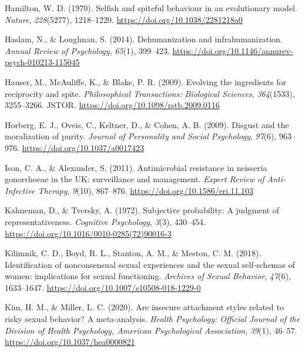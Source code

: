 \documentclass[
  english,
  donotrepeattitle,doc, 12pt, a4paper,floatsintext]{apa7}
\newlength{\cslhangindent}
\newlength{\cslentryspacingunit} %
\newenvironment{CSLReferences}[2] %
 {%
  \setlength{\parindent}{0pt}
  \ifodd #1
  \let\oldpar\par
  \def\par{\hangindent=\cslhangindent\oldpar}
  \fi
  \setlength{\parskip}{#2\cslentryspacingunit}
 }%
 {}
\begin{document}
\begin{CSLReferences}{1}{0}
\leavevmode{}%
Hamilton, W. D. (1970). Selfish and spiteful behaviour in an evolutionary model. \emph{Nature}, \emph{228}(5277), 1218--1220. \url{https://doi.org/10.1038/2281218a0}

\leavevmode{}%
Haslam, N., \& Loughnan, S. (2014). Dehumanization and infrahumanization. \emph{Annual Review of Psychology}, \emph{65}(1), 399--423. \url{https://doi.org/10.1146/annurev-psych-010213-115045}

\leavevmode{}%
Hauser, M., McAuliffe, K., \& Blake, P. R. (2009). Evolving the ingredients for reciprocity and spite. \emph{Philosophical Transactions: Biological Sciences}, \emph{364}(1533), 3255--3266. JSTOR. \url{https://doi.org/10.1098/rstb.2009.0116}

\leavevmode{}%
Horberg, E. J., Oveis, C., Keltner, D., \& Cohen, A. B. (2009). Disgust and the moralization of purity. \emph{Journal of Personality and Social Psychology}, \emph{97}(6), 963--976. \url{https://doi.org/10.1037/a0017423}

\leavevmode{}%
Ison, C. A., \& Alexander, S. (2011). Antimicrobial resistance in neisseria gonorrhoeae in the UK: surveillance and management. \emph{Expert Review of Anti-Infective Therapy}, \emph{9}(10), 867--876. \url{https://doi.org/10.1586/eri.11.103}

\leavevmode{}%
Kahneman, D., \& Tversky, A. (1972). Subjective probability: A judgment of representativeness. \emph{Cognitive Psychology}, \emph{3}(3), 430--454. \url{https://doi.org/10.1016/0010-0285(72)90016-3}

\leavevmode{}%
Kilimnik, C. D., Boyd, R. L., Stanton, A. M., \& Meston, C. M. (2018). Identification of nonconsensual sexual experiences and the sexual self-schemas of women: implications for sexual functioning. \emph{Archives of Sexual Behavior}, \emph{47}(6), 1633--1647. \url{https://doi.org/10.1007/s10508-018-1229-0}

\leavevmode{}%
Kim, H. M., \& Miller, L. C. (2020). Are insecure attachment styles related to risky sexual behavior? A meta-analysis. \emph{Health Psychology: Official Journal of the Division of Health Psychology, American Psychological Association}, \emph{39}(1), 46--57. \url{https://doi.org/10.1037/hea0000821}


\end{CSLReferences}
\end{document}
